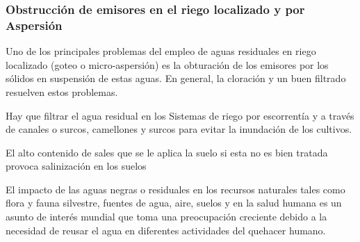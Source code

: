 \subsubsection{Obstrucción de emisores en el riego localizado y por Aspersión}

Uno de los principales problemas del empleo de aguas residuales en riego localizado (goteo o micro-aspersión) es la obturación de los emisores por los sólidos en suspensión de estas aguas. En general, la cloración y un buen filtrado resuelven estos problemas. 

Hay que filtrar el agua residual en los Sistemas de riego por escorrentía y a través de canales o surcos, camellones y surcos para evitar la inundación de los cultivos. 

El alto contenido de sales que se le aplica la suelo si esta no es bien tratada provoca salinización en los suelos

El impacto de las aguas negras o residuales en los recursos naturales tales como flora y fauna silvestre, fuentes de agua, aire, suelos y en la salud humana es un asunto de interés mundial que toma una preocupación creciente debido a la necesidad de reusar el agua en diferentes actividades del quehacer humano.

